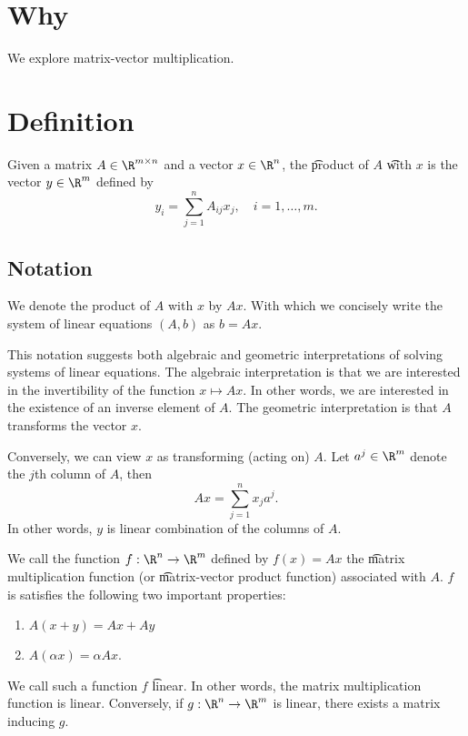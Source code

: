 
\section*{Why}

We explore matrix-vector multiplication.

\section*{Definition}

Given a matrix $A \in \R ^{m \times  n}$ and a vector $x \in \R ^{n}$, the \t{product} of $A$ \t{with} $x$ is the vector $y \in \R ^{m}$ defined by
  \[
y_i = \sum_{j = 1}^{n} A_{ij} x_j, \quad i = 1, \dots , m.
  \]

\subsection*{Notation}

We denote the product of $A$ with $x$ by $Ax$.
With which we concisely write the system of linear equations $(A, b)$ as $b = Ax$.

This notation suggests both algebraic and geometric interpretations of solving systems of linear equations.
The algebraic interpretation is that we are interested in the invertibility of the function $x \mapsto Ax$.
In other words, we are interested in the existence of an inverse element of $A$.
The geometric interpretation is that $A$ transforms the vector $x$.

Conversely, we can view $x$ as transforming (acting on) $A$.
Let $a^j \in \R ^m$ denote the $j$th column of $A$, then
  \[
Ax = \sum_{j = 1}^{n} x_j a^j.
  \]
In other words, $y$ is linear combination of the columns of $A$.

We call the function $f: \R ^n \to \R ^m$ defined by $f(x) = Ax$ the \t{matrix multiplication function} (or \t{matrix-vector product function}) associated with $A$.
$f$ is satisfies the following two important properties:
  \begin{enumerate}
  \item $A(x + y) = Ax + Ay$
  \item $A(\alpha x) = \alpha Ax$.
  \end{enumerate}
We call such a function $f$ \t{linear}.
In other words, the matrix multiplication function is linear.
Conversely, if $g: \R ^n \to \R ^m$ is linear, there exists a matrix inducing $g$.


